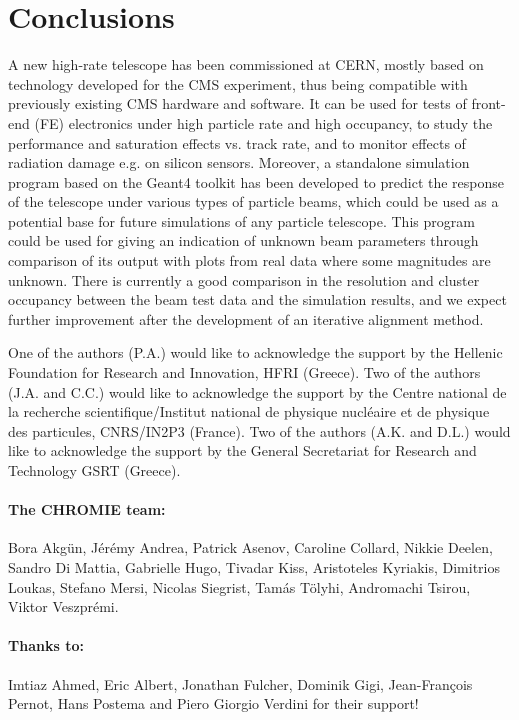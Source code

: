 \documentclass[a4paper,11pt]{article}
\begin{document}
\section{Conclusions}
A new high-rate telescope has been commissioned at CERN, mostly based on technology developed for the CMS experiment, thus being compatible with previously existing CMS hardware and software. It can be used for tests of front-end (FE) electronics under high particle rate and high occupancy, to study the performance and saturation effects vs. track rate, and to monitor effects of radiation damage e.g. on silicon sensors. Moreover, a standalone simulation program based on the Geant4 toolkit has been developed to predict the response of the telescope under various types of particle beams, which could be used as a potential base for future simulations of any particle telescope. This program could be used for giving an indication of unknown beam parameters through comparison of its output with plots from real data where some magnitudes are unknown. There is currently a good comparison in the resolution and cluster occupancy between the beam test data and the simulation results, and we expect further improvement after the development of an iterative alignment method.

\acknowledgments
One of the authors (P.A.) would like to acknowledge the support by the Hellenic Foundation for  Research and Innovation, HFRI (Greece). Two of the authors (J.A. and C.C.) would like to acknowledge the support by the Centre national de la recherche scientifique/Institut national de physique nucl\'eaire et de physique des particules, CNRS/IN2P3 (France). Two of the authors (A.K. and D.L.) would like to acknowledge the support by the General Secretariat for Research and Technology GSRT (Greece).

\paragraph{The CHROMIE team:} Bora Akg\"un, 
J\'er\'emy Andrea, Patrick Asenov, Caroline Collard, Nikkie Deelen, Sandro Di
Mattia, Gabrielle Hugo, Tivadar Kiss, Aristoteles
Kyriakis, Dimitrios Loukas, Stefano Mersi, Nicolas
Siegrist, Tam\'as T\"olyhi, Andromachi Tsirou, Viktor
Veszpr\'emi.	
\paragraph{Thanks to:} Imtiaz Ahmed, Eric Albert, Jonathan
Fulcher, Dominik Gigi, Jean-Fran\c{c}ois Pernot,
Hans Postema and Piero Giorgio Verdini for their
support!
\end{document}
